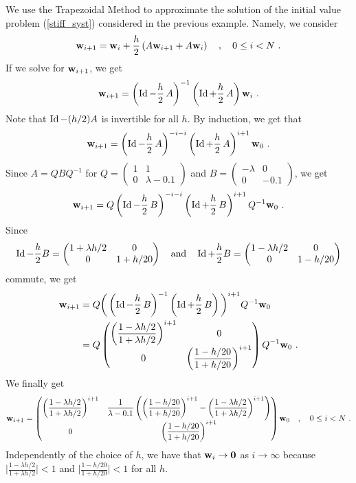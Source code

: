 \begin{egg}
We use the Trapezoidal Method to approximate the solution of
the initial value problem (\ref{stiff_syst}) considered in the previous
example.  Namely, we consider
\[
\mathbf{w}_{i+1} = \mathbf{w}_i + \frac{h}{2}\left( A \mathbf{w}_{i+1}
+ A \mathbf{w}_i \right) \quad , \quad 0 \leq i < N \ .
\]
If we solve for $\mathbf{w}_{i+1}$, we get
\[
\mathbf{w}_{i+1} = \left( \operatorname{Id} -\frac{h}{2}\,A \right)^{-1}
\left( \operatorname{Id} +\frac{h}{2}\,A\right) \mathbf{w}_i \ .
\]
Note that $\operatorname{Id} - (h/2)A$ is invertible for all $h$.  By
induction, we get that
\[
\mathbf{w}_{i+1} = \left( \operatorname{Id} -\frac{h}{2}\,A \right)^{-i-i}
\left( \operatorname{Id} +\frac{h}{2}\,A\right)^{i+1} \mathbf{w}_0 \ .
\]
Since $A = Q B Q^{-1}$ for
$Q=\begin{pmatrix}
1 & 1 \\
0 & \lambda -0.1
\end{pmatrix}$ and
$B=\begin{pmatrix}
-\lambda & 0 \\
0 & -0.1
\end{pmatrix}$, we get
\[
\mathbf{w}_{i+1} = Q\left( \operatorname{Id} -\frac{h}{2}\,B \right)^{-i-i}
\left( \operatorname{Id} +\frac{h}{2}\,B\right)^{i+1}Q^{-1} \mathbf{w}_0 \ .
\]
Since
\[
\operatorname{Id} - \frac{h}{2} B =
\begin{pmatrix}
1 + \lambda h/2 & 0 \\
0 & 1 + h/20  
\end{pmatrix}
\quad \text{and} \quad
\operatorname{Id} + \frac{h}{2} B =
\begin{pmatrix}
1 - \lambda h/2 & 0 \\
0 & 1 - h/20  
\end{pmatrix}
\]
commute, we get
\begin{align*}
\mathbf{w}_{i+1} &= Q \bigg( \left( \operatorname{Id} -\frac{h}{2}\,B \right)^{-1}
\left( \operatorname{Id} +\frac{h}{2}\,B\right)\bigg)^{i+1}Q^{-1} \mathbf{w}_0 \\
&= Q
\begin{pmatrix}
\left(\displaystyle \frac{1-\lambda h/2}{1+\lambda h/2}\right)^{i+1}
& 0 \\
0 &                                                                     
\left(\displaystyle \frac{1- h/20}{1+ h/20}\right)^{i+1}
\end{pmatrix}
Q^{-1} \mathbf{w}_0 \ .
\end{align*}
We finally get
\[
\mathbf{w}_{i+1} =
\begin{pmatrix}
\left(\displaystyle \frac{1-\lambda h/2}{1+\lambda h/2}\right)^{i+1}
& \displaystyle
\frac{1}{\lambda - 0.1} \left( \left(\frac{1- h/20}{1+ h/20}\right)^{i+1}
- \left(\frac{1-\lambda h/2}{1+\lambda h/2}\right)^{i+1}\right)
\\
0 &                                                                     
\left(\displaystyle \frac{1- h/20}{1+ h/20}\right)^{i+1}
\end{pmatrix} \mathbf{w}_0
\quad , \quad 0 \leq i < N \ .
\]
Independently of the choice of $h$, we have that
$\mathbf{w}_i \rightarrow \mathbf{0}$ as $i \rightarrow \infty$ because
$\displaystyle \bigg| \frac{1-\lambda h/2}{1+\lambda h/2} \bigg| < 1$
and
$\displaystyle \bigg| \frac{1-h/20}{1+h/20} \bigg| < 1$
for all $h$.


\end{egg}
